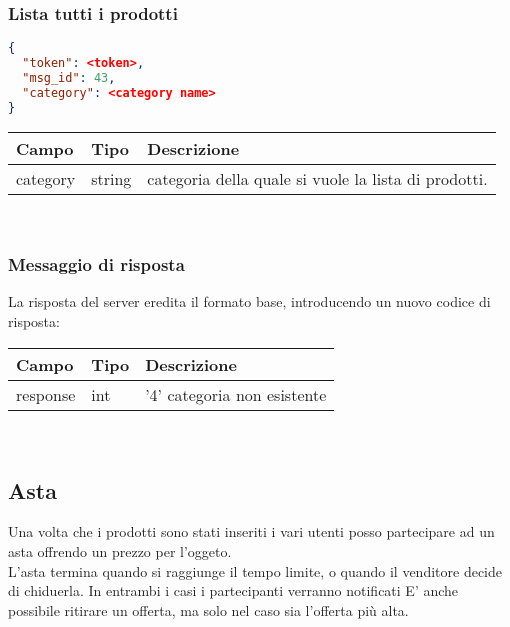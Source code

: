 \subsubsection{Lista tutti i prodotti}
\begin{lstlisting}[language=json]
{
  "token": <token>,
  "msg_id": 43,
  "category": <category name>
}
\end{lstlisting}

\begin{tabular}{|l | l | l |}
\hline
Campo & Tipo & Descrizione \\ \hline
category & string & categoria  della quale si vuole la lista di prodotti. \\ \hline
\end{tabular} \\
\subsubsection{Messaggio di risposta}
La risposta del server eredita il formato base, introducendo un nuovo codice di risposta:\\
\begin{tabular}{|l | l | l |}
\hline
Campo & Tipo & Descrizione \\ \hline
response & int & '4' categoria non esistente \\ \hline
\end{tabular} \\


\subsection{Asta}
Una volta che i prodotti sono stati inseriti i vari utenti posso partecipare ad un asta offrendo un prezzo per l'oggeto.\\
L'asta termina quando si raggiunge il tempo limite, o quando il venditore decide di chiduerla. In entrambi i casi i partecipanti verranno notificati
E' anche possibile ritirare un offerta, ma solo nel caso sia l'offerta più alta.
